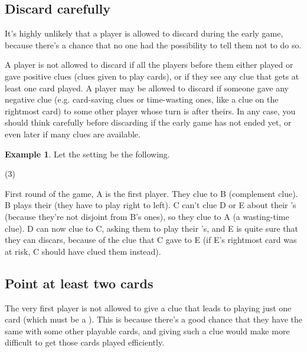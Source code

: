\documentclass[a4paper]{article}
\theoremstyle{plain}
\theoremstyle{definition}
\newtheorem{example}[theorem]{Example}
\begin{document}
\subsection{Discard carefully}

It's highly unlikely that a player is allowed to discard during the early game, because there's a chance that no one had the possibility to tell them not to do so.

A player is not allowed to discard if all the players before them either played or gave positive clues (clues given to play cards), or if they see any clue that gets at least one card played. A player may be allowed to discard if someone gave any negative clue (e.g. card-saving clues or time-wasting ones, like a  clue on the rightmost card) to some other player whose turn is after theirs. In any case, you should think carefully before discarding if the early game has not ended yet, or even later if many clues are available.

\begin{example}
	
	Let the setting be the following.
	
	\begin{tasks}(3)
		\task[+]      
		\task[A]    
		\task[B]    
		\task[C]    
		\task[D]    
		\task[E]    
	\end{tasks}
	
	First round of the game, A is the first player. They clue  to B (complement clue). B plays their  (they have to play right to left). C can't clue D or E about their 's (because they're not disjoint from B's ones), so they clue  to A (a wasting-time clue). D can now clue  to C, asking them to play their 's, and E is quite sure that they can discars, because of the  clue that C gave to E (if E's rightmost card was at risk, C should have clued them instead).
\end{example}

\subsection{Point at least two cards}

The very first player is not allowed to give a clue that leads to playing just one card (which must be a ). This is because there's a good chance that they have the same  with some other playable cards, and giving such a clue would make more difficult to get those cards played efficiently.
\end{document}
